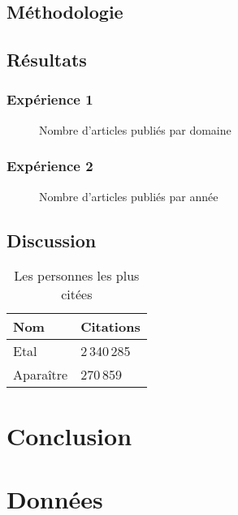\documentclass[phd]{dissertum}
\begin{document}
    \section{Méthodologie}
      \lipsum[2]
    \section{Résultats}
      \lipsum[3]
      \subsection{Expérience 1}
        \lipsum[4]
        \begin{figure}[tbh]
          \centering
          \caption{Nombre d'articles publiés par domaine}
        \end{figure}
      \subsection{Expérience 2}
        \lipsum[5]
        \begin{figure}[tbh]
          \centering
          \caption{Nombre d'articles publiés par année}
        \end{figure}
    \section{Discussion}
      \lipsum[6]
      \begin{table}[tbh]
        \centering
        \begin{tabular}{ll}
          \toprule
          \bf Nom & \bf Citations \\
          \midrule
          Etal & 2\,340\,285 \\
          Aparaître & 270\,859 \\ 
          \bottomrule
        \end{tabular}
        \caption{Les personnes les plus citées}
      \end{table}

  \chapter{Conclusion}
    \lipsum[7]

  
  
  
  
  \appendix
  \chapter{Données}
    \lipsum[8-10]
\end{document}
